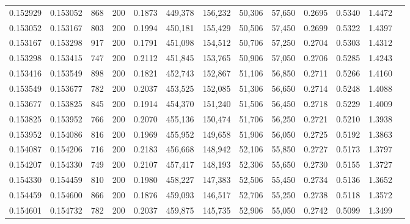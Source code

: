 \begin{tabular}{rrrrrrrrrrrrr}
0.152929 & 0.153052 &    868 & 200 &                                     0.1873 & 449,378 & 156,232 &  50,306 &  57,650 & 0.2695 & 0.5340 & 1.4472 \\
0.153052 & 0.153167 &    803 & 200 &                                     0.1994 & 450,181 & 155,429 &  50,506 &  57,450 & 0.2699 & 0.5322 & 1.4397 \\
0.153167 & 0.153298 &    917 & 200 &                                     0.1791 & 451,098 & 154,512 &  50,706 &  57,250 & 0.2704 & 0.5303 & 1.4312 \\
0.153298 & 0.153415 &    747 & 200 &                                     0.2112 & 451,845 & 153,765 &  50,906 &  57,050 & 0.2706 & 0.5285 & 1.4243 \\
0.153416 & 0.153549 &    898 & 200 &                                     0.1821 & 452,743 & 152,867 &  51,106 &  56,850 & 0.2711 & 0.5266 & 1.4160 \\
0.153549 & 0.153677 &    782 & 200 &                                     0.2037 & 453,525 & 152,085 &  51,306 &  56,650 & 0.2714 & 0.5248 & 1.4088 \\
0.153677 & 0.153825 &    845 & 200 &                                     0.1914 & 454,370 & 151,240 &  51,506 &  56,450 & 0.2718 & 0.5229 & 1.4009 \\
0.153825 & 0.153952 &    766 & 200 &                                     0.2070 & 455,136 & 150,474 &  51,706 &  56,250 & 0.2721 & 0.5210 & 1.3938 \\
0.153952 & 0.154086 &    816 & 200 &                                     0.1969 & 455,952 & 149,658 &  51,906 &  56,050 & 0.2725 & 0.5192 & 1.3863 \\
0.154087 & 0.154206 &    716 & 200 &                                     0.2183 & 456,668 & 148,942 &  52,106 &  55,850 & 0.2727 & 0.5173 & 1.3797 \\
0.154207 & 0.154330 &    749 & 200 &                                     0.2107 & 457,417 & 148,193 &  52,306 &  55,650 & 0.2730 & 0.5155 & 1.3727 \\
0.154330 & 0.154459 &    810 & 200 &                                     0.1980 & 458,227 & 147,383 &  52,506 &  55,450 & 0.2734 & 0.5136 & 1.3652 \\
0.154459 & 0.154600 &    866 & 200 &                                     0.1876 & 459,093 & 146,517 &  52,706 &  55,250 & 0.2738 & 0.5118 & 1.3572 \\
0.154601 & 0.154732 &    782 & 200 &                                     0.2037 & 459,875 & 145,735 &  52,906 &  55,050 & 0.2742 & 0.5099 & 1.3499 \\

\end{tabular}
